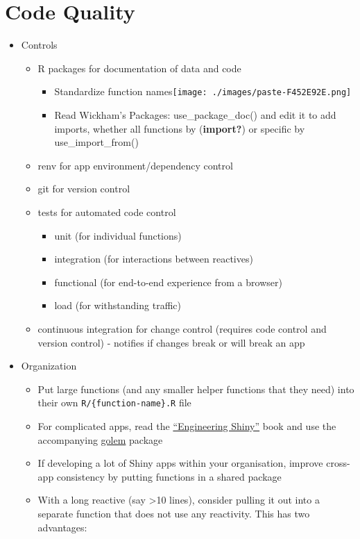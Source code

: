 \documentclass[
  letterpaper,
  DIV=11,
  numbers=noendperiod,
  oneside]{scrreprt}
\begin{document}
\hypertarget{code-quality}{%
\chapter{Code Quality}\label{code-quality}}

\begin{itemize}
\item
  Controls

  \begin{itemize}
  \item
    R packages for documentation of data and code

    \begin{itemize}
    \item
      Standardize function
      names\texttt{[image: ./images/paste-F452E92E.png]}
    \item
      Read Wickham's Packages: use\_package\_doc() and edit it to add
      imports, whether all functions by (\textbf{import?}) or specific
      by use\_import\_from()
    \end{itemize}
  \item
    renv for app environment/dependency control
  \item
    git for version control
  \item
    tests for automated code control

    \begin{itemize}
    \item
      unit (for individual functions)
    \item
      integration (for interactions between reactives)
    \item
      functional (for end-to-end experience from a browser)
    \item
      load (for withstanding traffic)
    \end{itemize}
  \item
    continuous integration for change control (requires code control and
    version control) - notifies if changes break or will break an app
  \end{itemize}
\item
  Organization

  \begin{itemize}
  \item
    Put large functions (and any smaller helper functions that they
    need) into their own \texttt{R/\{function-name\}.R} file
  \item
    For complicated apps, read the
    \href{https://engineering-shiny.org/}{``Engineering Shiny''} book
    and use the accompanying
    \href{https://thinkr-open.github.io/golem/}{golem} package
  \item
    If developing a lot of Shiny apps within your organisation, improve
    cross-app consistency by putting functions in a shared package
  \item
    With a long reactive (say \textgreater10 lines), consider pulling it
    out into a separate function that does not use any reactivity. This
    has two advantages:


\end{itemize}
\end{itemize}
\end{document}
